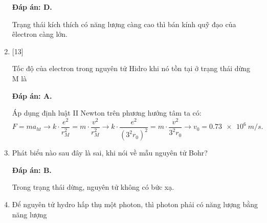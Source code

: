 \begin{enumerate}[label=\bfseries Câu \arabic*:]
	\loigiai
	{		\textbf{Đáp án: D.}
		
		Trạng thái kích thích có năng lượng càng cao thì bán kính quỹ đạo của êlectron càng lớn.		
	}
	
	\item {} [13]
		\cauhoi
	{Tốc độ của electron trong nguyên tử Hidro khi nó tồn tại ở trạng thái dừng M là
	}
	
	\loigiai
	{		\textbf{Đáp án: A.}
		
		Áp dụng định luật II Newton trên phương hướng tâm ta có:
		$$
		F = m a_{ht} \rightarrow k \cdot \dfrac{e^{2}}{r_{M}^2} = m \cdot \dfrac{v^{2}}{r_{M}^2} \rightarrow k \cdot \dfrac{e^{2}}{\left( 3^{2} r_{0} \right)^{2}} = m \cdot \dfrac{v^{2}}{ 3^{2} r_{0} } \rightarrow v_{0} = \SI{0,73e6}{m/s}.
		$$		
	}
		\item {} 
		\cauhoi
	{Phát biểu nào sau đây là sai, khi nói về mẫu nguyên tử Bohr?
		
	}
	
	\loigiai
	{		\textbf{Đáp án: B.}
		
		Trong trạng thái dừng, nguyên tử không có bức xạ. 
	}
		\item {}
		\cauhoi
	{Để nguyên tử hydro hấp thụ một photon, thì photon phải có năng lượng bằng năng lượng
		}
\end{enumerate}
